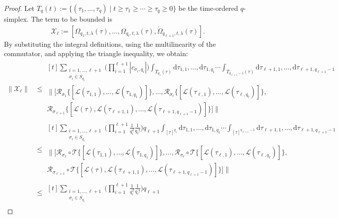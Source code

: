 \documentclass[11pt]{article}
\renewcommand{\d}{\mathrm{d}}
\newcommand{\mc}{\mathcal}
\begin{document}
\begin{proof}
Let $T_q(t) := \{(\tau_1, \ldots, \tau_q) \mid t \ge \tau_1 \ge \cdots \ge \tau_q \ge 0\}$ be the time-ordered $q$-simplex.
 The term to be bounded is
\begin{align*}
    \mc{X}_{\ell} := [\Omega_{q_1, t, \lambda}(\tau), \ldots, \Omega_{q_\ell, t, \lambda}(\tau), \dot{\Omega}_{q_{\ell+1}, t,\lambda}(\tau)].
\end{align*}
By substituting the integral definitions, using the multilinearity of the commutator, and applying the triangle inequality, we obtain:
\begin{align}
    \|\mc{X}_{\ell}\| 
    &\le \begin{multlined}[t]\sum_{\substack{i = 1 , \ldots, \ell+1\\\sigma_i\in S_{q_{i}}}} \bigg(\prod_{i=1}^{\ell+1} |c_{\sigma_i, q_i}|\bigg) \int_{T_{q_1}(\tau)} \d\tau_{1,1}, \ldots,\d\tau_{1,q_1}\cdots\int_{T_{q_{\ell+1}-1}(\tau)}\d\tau_{\ell+1,1},\ldots,\d\tau_{\ell+1,q_{\ell+1}-1} \\
        \bigg\| \Big[ \mc R_{\sigma_1}\big\{[\mc L(\tau_{1,1}), \ldots, \mc L(\tau_{1,q_1})]\big\}, \ldots, \mc R_{\sigma_\ell}\big\{[\mc L(\tau_{\ell,1}), \ldots, \mc L(\tau_{\ell,q_\ell})]\big\},  \\
        \mc R_{\sigma_{\ell+1}}\big\{[\mc L(\tau), \mc L(\tau_{\ell+1,1}), \ldots, \mc L(\tau_{\ell+1,q_{\ell+1}-1})]\big\} \Big] \bigg\|\nonumber
    \end{multlined}\\
    & \le \begin{multlined}[t]\sum_{\substack{i = 1 , \ldots, \ell+1\\\sigma_i\in S_{q_{i}}}} \bigg(\prod_{i=1}^{\ell+1} \frac{1}{q_i^2} \frac{1}{q_i!}\bigg)q_{\ell+1} \int_{[\tau]^{q_1}} \d\tau_{1,1}, \ldots,\d\tau_{1,q_1}\cdots\int_{[\tau]^{q_{\ell+1}-1}}\d\tau_{\ell+1,1},\ldots,\d\tau_{\ell+1,q_{\ell+1}-1} \\
        \bigg\| \Big[ \mc R_{\sigma_1}\circ \mc T\big\{[\mc L(\tau_{1,1}), \ldots, \mc L(\tau_{1,q_1})]\big\}, \ldots, \mc R_{\sigma_\ell}\circ \mc T\big\{[\mc L(\tau_{\ell,1}), \ldots, \mc L(\tau_{\ell,q_\ell})]\big\},  \\
        \mc R_{\sigma_{\ell+1}}\circ \mc T\big\{[\mc L(\tau), \mc L(\tau_{\ell+1,1}), \ldots, \mc L(\tau_{\ell+1,q_{\ell+1}-1})]\big\} \Big] \bigg\|\nonumber
    \end{multlined}\\
    & \le \begin{multlined}[t]\sum_{\substack{i = 1 , \ldots, \ell+1\\\sigma_i\in S_{q_{i}}}} \bigg(\prod_{i=1}^{\ell+1} \frac{1}{q_i^2} \frac{1}{q_i!}\bigg)q_{\ell+1}

\end{multlined}
\end{align}
\end{proof}
\end{document}
